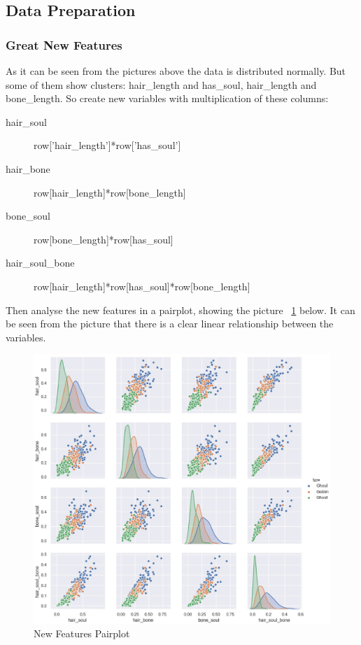 \subsection{Data Preparation}

\subsubsection{Great New Features}


As it can be seen from 
the pictures above 
the data is distributed normally. 
But some of them show clusters: 
hair_length and has_soul, 
hair_length and bone_length. 
So create new variables 
with multiplication of these columns: 

\begin{description}
	\item[hair_soul] row[’hair_length’]*row[’has_soul’] 
	\item[hair_bone]  row[hair_length]*row[bone_length] 
	\item[bone_soul]  row[bone_length]*row[has_soul] 
	\item[hair_soul_bone]  row[hair_length]*row[has_soul]*row[bone_length] 
\end{description}


Then analyse the new features in a pairplot, 
showing the picture ~\cref{fig:new_pairplot}
below. 
It can be seen from the picture that 
there is a clear linear relationship 
between the variables. 


\begin{figure}[htbp]\centering
	\label{fig:new_pairplot}
	\includegraphics[scale=0.3]{figures/hist_1.eps}
	\caption{New Features Pairplot}
\end{figure}


